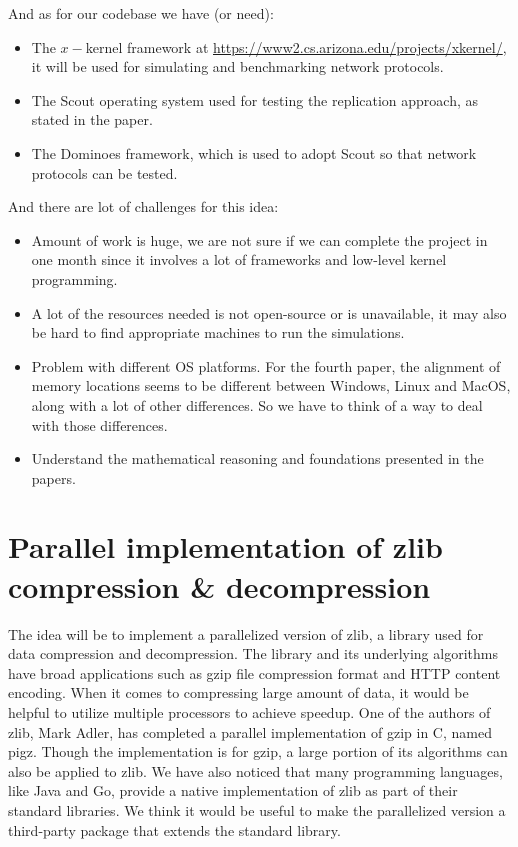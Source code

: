 \documentclass[11pt]{article}
\begin{document}
	And as for our codebase we have (or need):
	\begin{itemize}
		\item The $x-$kernel framework at \url{https://www2.cs.arizona.edu/projects/xkernel/}, it will be used for simulating and benchmarking network protocols.
		\item The Scout operating system used for testing the replication approach, as stated in the paper.
		\item The Dominoes framework, which is used to adopt Scout so that network protocols can be tested.
	\end{itemize}
	And there are lot of challenges for this idea:
	\begin{itemize}
		\item Amount of work is huge, we are not sure if we can complete the project in one month since it involves a lot of frameworks and low-level kernel programming.
		\item A lot of the resources needed is not open-source or is unavailable, it may also be hard to find appropriate machines to run the simulations.
		\item Problem with different OS platforms. For the fourth paper, the alignment of memory locations seems to be different between Windows, Linux and MacOS, along with a lot of other differences. So we have to think of a way to deal with those differences.
		\item Understand the mathematical reasoning and foundations presented in the papers.
	\end{itemize}

	\section{Parallel implementation of zlib compression \& decompression}
	The idea will be to implement a parallelized version of zlib, a library used for data compression and decompression. The library and its underlying algorithms have broad applications such as gzip file compression format and HTTP content encoding. When it comes to compressing large amount of data, it would be helpful to utilize multiple processors to achieve speedup. One of the authors of zlib, Mark Adler, has completed a parallel implementation of gzip in C, named pigz. Though the implementation is for gzip, a large portion of its algorithms can also be applied to zlib. We have also noticed that many programming languages, like Java and Go, provide a native implementation of zlib as part of their standard libraries. We think it would be useful to make the parallelized version a third-party package that extends the standard library.
	
\end{document}
